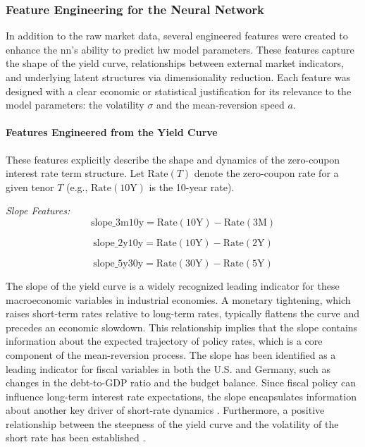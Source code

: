 \subsubsection{Feature Engineering for the Neural Network}
In addition to the raw market data, several engineered features were created to enhance the \ac{nn}'s ability to predict \ac{hw} model parameters. These features capture the shape of the yield curve, relationships between external market indicators, and underlying latent structures via dimensionality reduction. Each feature was designed with a clear economic or statistical justification for its relevance to the model parameters: the volatility \(\sigma\) and the mean-reversion speed \(a\).

\paragraph{Features Engineered from the Yield Curve}
These features explicitly describe the shape and dynamics of the zero-coupon interest rate term structure. Let \(\text{Rate}(T)\) denote the zero-coupon rate for a given tenor \(T\) (e.g., \(\text{Rate}(10\text{Y})\) is the 10-year rate).

\textit{Slope Features:}
\begin{equation}
	\text{slope\_3m10y} = \text{Rate}(10\text{Y}) - \text{Rate}(3\text{M})
\end{equation}

\begin{equation}
	\text{slope\_2y10y} = \text{Rate}(10\text{Y}) - \text{Rate}(2\text{Y})
\end{equation}

\begin{equation}
	\text{slope\_5y30y} = \text{Rate}(30\text{Y}) - \text{Rate}(5\text{Y})
\end{equation}

The slope of the yield curve is a widely recognized leading indicator for these macroeconomic variables in industrial economies. A monetary tightening, which raises short-term rates relative to long-term rates, typically flattens the curve and precedes an economic slowdown. This relationship implies that the slope contains information about the expected trajectory of policy rates, which is a core component of the mean-reversion process. The slope has been identified as a leading indicator for fiscal variables in both the U.S. and Germany, such as changes in the debt-to-GDP ratio and the budget balance. Since fiscal policy can influence long-term interest rate expectations, the slope encapsulates information about another key driver of short-rate dynamics \parencite{mehl2006yieldcurvepredictor}. Furthermore, a positive relationship between the steepness of the yield curve and the volatility of the short rate has been established \parencite{christiansen2005revisityieldcurve}.

